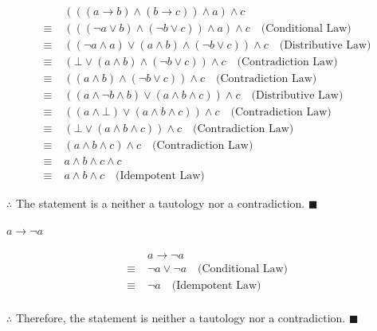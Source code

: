 \documentclass[]{article}
\begin{document}
\begin{align*}
    & (((a \rightarrow b) \land (b \rightarrow c)) \land a) \land c \\
    \equiv\; & (((\neg a \lor b) \land (\neg b \lor c)) \land a) \land c \quad \text{(Conditional Law)} \\
    \equiv\; & ((\neg a \land a) \lor (a\land b) \land (\neg b \lor c)) \land c \quad \text{(Distributive Law)} \\
    \equiv\; & (\bot \lor (a\land b) \land (\neg b \lor c)) \land c \quad \text{(Contradiction Law)} \\
    \equiv\; & ((a\land b) \land (\neg b \lor c)) \land c \quad \text{(Contradiction Law)} \\
    \equiv\; & ((a \land \neg b \land b) \lor (a \land b \land c)) \land  c \quad \text{(Distributive Law)} \\
    \equiv\; & ((a \land \bot) \lor (a\land b\land c)) \land  c \quad \text{(Contradiction Law)} \\
    \equiv\; & (\bot \lor (a\land b\land c)) \land c \quad \text{(Contradiction Law)} \\
    \equiv\; & (a\land b\land c) \land c \quad \text{(Contradiction Law)} \\
    \equiv\; & a \land b \land c \land c \quad \\
    \equiv\; & a \land b \land c \quad \text{(Idempotent Law)}
\end{align*}
\begin{center}
    $\therefore$ The statement is a neither a tautology nor a contradiction. $\blacksquare$
\end{center}

\begin{question}
    $a \rightarrow \neg a$
\end{question}
\begin{align*}
    & a \rightarrow \neg a \\
    \equiv\; & \neg a \lor \neg a \quad \text{(Conditional Law)} \\
    \equiv\; & \neg a \quad \text{(Idempotent Law)} \\
\end{align*}
\begin{center}
    $\therefore$ Therefore, the statement is neither a tautology nor a contradiction. $\blacksquare$
\end{center}
\end{document}
